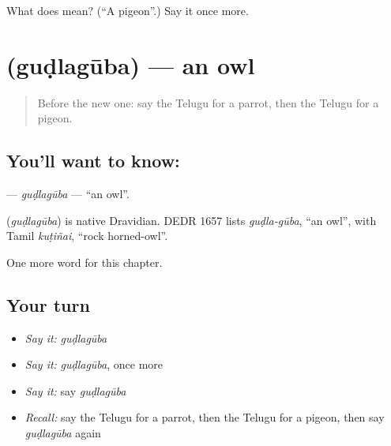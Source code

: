 \begin{tcolorbox}[breakable,colback=teal!4,colframe=teal!35!black,title={Before you move on}]
What does  mean? (\textquotedblleft{}A pigeon\textquotedblright{}.) Say it once more.
\end{tcolorbox}
\section[\texorpdfstring{\te{గుడ్లగూబ} (guḍlagūba)}{గుడ్లగూబ (guḍlagūba)}]{ (guḍlagūba) — an owl}

\label{lesson:TE-C125-gudlaguba}



\begin{quote}
Before the new one: say the Telugu for a parrot, then the Telugu for a pigeon.
\end{quote}

\subsection*{You'll want to know: }
\textbf{} — \emph{guḍlagūba} — \textquotedblleft{}an owl\textquotedblright{}.

\begin{cousinweb}
\textbf{} (\emph{guḍlagūba}) is native Dravidian. DEDR 1657 lists \emph{guḍla-gūba}, \textquotedblleft{}an owl\textquotedblright{}, with Tamil \emph{kuṭiñai}, \textquotedblleft{}rock horned-owl\textquotedblright{}.
\end{cousinweb}

\begin{grammarlens}[title={What you've built}]
One more word for this chapter.
\end{grammarlens}

\subsection*{Your turn}
\begin{itemize}
\raggedright
  \item \emph{Say it:} \emph{guḍlagūba}
  \item \emph{Say it:} \emph{guḍlagūba}, once more
  \item \emph{Say it:} say \emph{guḍlagūba}
  \item \emph{Recall:} say the Telugu for a parrot, then the Telugu for a pigeon, then say \emph{guḍlagūba} again
\end{itemize}

